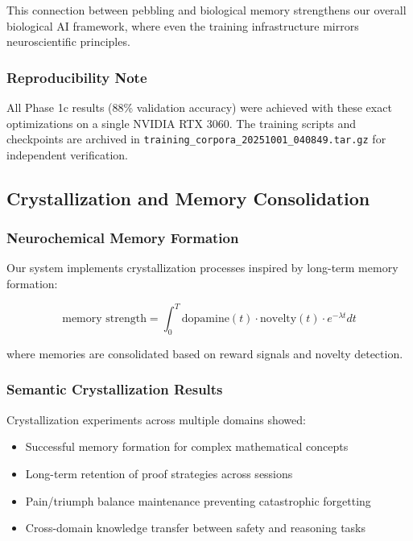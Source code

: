 \documentclass[12pt]{article}
\begin{document}
This connection between pebbling and biological memory strengthens our overall biological AI framework, where even the training infrastructure mirrors neuroscientific principles.

\subsubsection{Reproducibility Note}

All Phase 1c results (88\% validation accuracy) were achieved with these exact optimizations on a single NVIDIA RTX 3060. The training scripts and checkpoints are archived in \texttt{training\_corpora\_20251001\_040849.tar.gz} for independent verification.

\subsection{Crystallization and Memory Consolidation}

\subsubsection{Neurochemical Memory Formation}

Our system implements crystallization processes inspired by long-term memory formation:

\begin{equation}
\text{memory strength} = \int_0^T \text{dopamine}(t) \cdot \text{novelty}(t) \cdot e^{-\lambda t} dt
\end{equation}

where memories are consolidated based on reward signals and novelty detection.

\subsubsection{Semantic Crystallization Results}

Crystallization experiments across multiple domains showed:
\begin{itemize}
\item Successful memory formation for complex mathematical concepts
\item Long-term retention of proof strategies across sessions
\item Pain/triumph balance maintenance preventing catastrophic forgetting
\item Cross-domain knowledge transfer between safety and reasoning tasks
\end{itemize}
\end{document}
